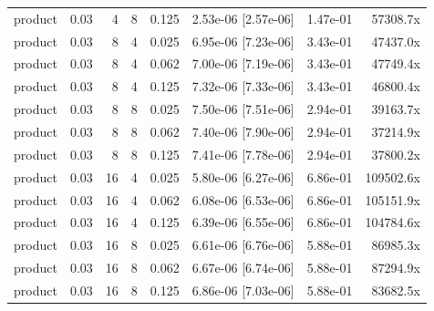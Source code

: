 \begin{tabular}{lrrrrrrr}
product & 0.03 & 4 & 8 & 0.125 & 2.53e-06 [2.57e-06] & 1.47e-01 & 57308.7x \\
product & 0.03 & 8 & 4 & 0.025 & 6.95e-06 [7.23e-06] & 3.43e-01 & 47437.0x \\
product & 0.03 & 8 & 4 & 0.062 & 7.00e-06 [7.19e-06] & 3.43e-01 & 47749.4x \\
product & 0.03 & 8 & 4 & 0.125 & 7.32e-06 [7.33e-06] & 3.43e-01 & 46800.4x \\
product & 0.03 & 8 & 8 & 0.025 & 7.50e-06 [7.51e-06] & 2.94e-01 & 39163.7x \\
product & 0.03 & 8 & 8 & 0.062 & 7.40e-06 [7.90e-06] & 2.94e-01 & 37214.9x \\
product & 0.03 & 8 & 8 & 0.125 & 7.41e-06 [7.78e-06] & 2.94e-01 & 37800.2x \\
product & 0.03 & 16 & 4 & 0.025 & 5.80e-06 [6.27e-06] & 6.86e-01 & 109502.6x \\
product & 0.03 & 16 & 4 & 0.062 & 6.08e-06 [6.53e-06] & 6.86e-01 & 105151.9x \\
product & 0.03 & 16 & 4 & 0.125 & 6.39e-06 [6.55e-06] & 6.86e-01 & 104784.6x \\
product & 0.03 & 16 & 8 & 0.025 & 6.61e-06 [6.76e-06] & 5.88e-01 & 86985.3x \\
product & 0.03 & 16 & 8 & 0.062 & 6.67e-06 [6.74e-06] & 5.88e-01 & 87294.9x \\
product & 0.03 & 16 & 8 & 0.125 & 6.86e-06 [7.03e-06] & 5.88e-01 & 83682.5x \\
\bottomrule
\end{tabular}
